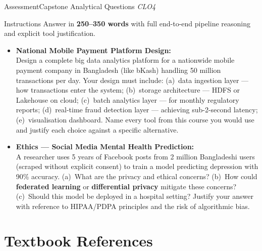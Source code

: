 \documentclass[aspectratio=169,10pt]{beamer}
\begin{document}
\begin{frame}{Assessment\textemdash Capstone Analytical Questions \hfill\small\textit{CLO4}}
  \begin{block}{Instructions}
    Answer in \textbf{250--350 words} with full end-to-end pipeline reasoning and explicit tool justification.
  \end{block}
  \vspace{4pt}
  \begin{itemize}
    \item[\textbf{A1.}] \textbf{National Mobile Payment Platform Design:}\\
    Design a complete big data analytics platform for a nationwide mobile payment company in Bangladesh (like bKash) handling 50 million transactions per day.  Your design must include: (a)\ data ingestion layer --- how transactions enter the system; (b)\ storage architecture --- HDFS or Lakehouse on cloud; (c)\ batch analytics layer --- for monthly regulatory reports; (d)\ real-time fraud detection layer --- achieving sub-2-second latency; (e)\ visualisation dashboard.  Name every tool from this course you would use and justify each choice against a specific alternative.
  \end{itemize}
  \vspace{6pt}
  \begin{itemize}
    \item[\textbf{A2.}] \textbf{Ethics --- Social Media Mental Health Prediction:}\\
    A researcher uses 5 years of Facebook posts from 2 million Bangladeshi users (scraped without explicit consent) to train a model predicting depression with 90\% accuracy.  (a)\ What are the privacy and ethical concerns?  (b)\ How could \textbf{federated learning} or \textbf{differential privacy} mitigate these concerns?  (c)\ Should this model be deployed in a hospital setting?  Justify your answer with reference to HIPAA/PDPA principles and the risk of algorithmic bias.
  \end{itemize}
\end{frame}

\section*{Textbook References}
\end{document}
